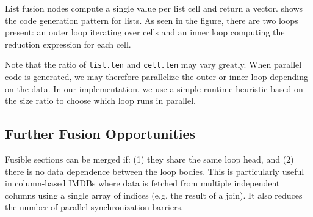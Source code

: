 List fusion nodes compute a single value per list cell and return a vector.  shows the code generation pattern for lists. As seen in
the figure, there are two loops present: an outer loop iterating over cells and an
inner loop computing the reduction expression for each cell.


Note that the ratio of \texttt{list.len} and \texttt{cell.len} may vary greatly.
When parallel code is generated, we may therefore parallelize the outer or inner loop
depending on the data. In our implementation, we use a simple runtime heuristic based
on the size ratio to choose which loop runs in parallel.

\subsection{Further Fusion Opportunities}

Fusible sections can be merged if:
(1) they share the same loop head, and
(2) there is no data dependence between the loop bodies.
This is particularly useful in column-based IMDBs where data is fetched
from multiple independent columns using a single array of indices (e.g. the result
of a join). It also reduces the number of parallel synchronization barriers.

